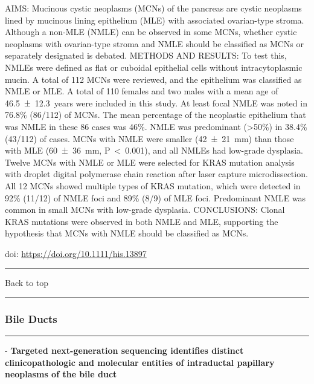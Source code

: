 \documentclass[
]{article}
\renewcommand{\linethickness}{0.05em}
\begin{document}
AIMS: Mucinous cystic neoplasms (MCNs) of the pancreas are cystic
neoplasms lined by mucinous lining epithelium (MLE) with associated
ovarian-type stroma. Although a non-MLE (NMLE) can be observed in some
MCNs, whether cystic neoplasms with ovarian-type stroma and NMLE should
be classified as MCNs or separately designated is debated. METHODS AND
RESULTS: To test this, NMLEs were defined as flat or cuboidal epithelial
cells without intracytoplasmic mucin. A total of 112 MCNs were reviewed,
and the epithelium was classified as NMLE or MLE. A total of 110 females
and two males with a mean age of 46.5~±~12.3~years were included in this
study. At least focal NMLE was noted in 76.8\% (86/112) of MCNs. The
mean percentage of the neoplastic epithelium that was NMLE in these 86
cases was 46\%. NMLE was predominant (\textgreater50\%) in 38.4\%
(43/112) of cases. MCNs with NMLE were smaller (42~±~21~mm) than those
with MLE (60~±~36~mm, P~\textless~0.001), and all NMLEs had low-grade
dysplasia. Twelve MCNs with NMLE or MLE were selected for KRAS mutation
analysis with droplet digital polymerase chain reaction after laser
capture microdissection. All 12 MCNs showed multiple types of KRAS
mutation, which were detected in 92\% (11/12) of NMLE foci and 89\%
(8/9) of MLE foci. Predominant NMLE was common in small MCNs with
low-grade dysplasia. CONCLUSIONS: Clonal KRAS mutations were observed in
both NMLE and MLE, supporting the hypothesis that MCNs with NMLE should
be classified as MCNs.

doi: \url{https://doi.org/10.1111/his.13897}

\begin{center}\rule{0.5\linewidth}{\linethickness}\end{center}

Back to top

\begin{center}\rule{0.5\linewidth}{\linethickness}\end{center}

\pagebreak

\hypertarget{bile-ducts-1}{%
\subsubsection{Bile Ducts}\label{bile-ducts-1}}

\begin{center}\rule{0.5\linewidth}{\linethickness}\end{center}

- \textbf{Targeted next-generation sequencing identifies distinct
clinicopathologic and molecular entities of intraductal papillary
neoplasms of the bile duct}
\end{document}
